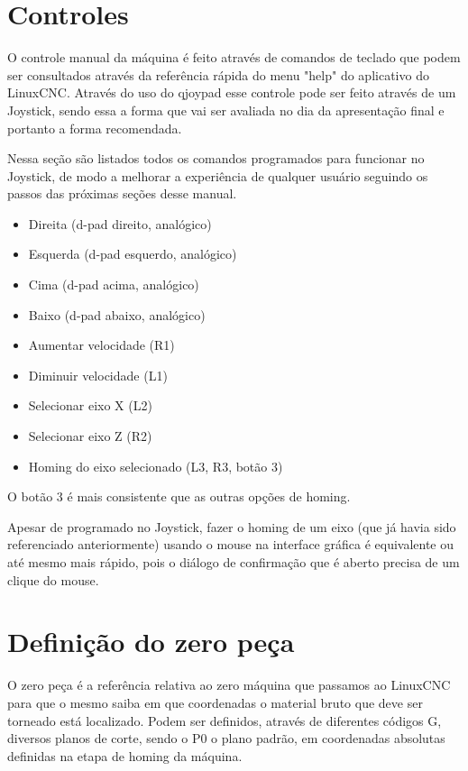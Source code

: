 \documentclass[twoside,a4paper]{refart}
\begin{document}
\section{Controles}

O controle manual da máquina é feito através de comandos de teclado que podem ser consultados através da referência rápida do menu "help" do aplicativo do LinuxCNC. Através do uso do qjoypad esse controle pode ser feito através de um Joystick, sendo essa a forma que vai ser avaliada no dia da apresentação final e portanto a forma recomendada. 

Nessa seção são listados todos os comandos programados para funcionar no Joystick, de modo a melhorar a experiência de qualquer usuário seguindo os passos das próximas seções desse manual. 

\begin{itemize}
    \item Direita (d-pad direito, analógico) 
    \item Esquerda (d-pad esquerdo, analógico)
    \item Cima (d-pad acima, analógico)
    \item Baixo (d-pad abaixo, analógico)
    \item Aumentar velocidade (R1) 
    \item Diminuir velocidade (L1)
    \item Selecionar eixo X (L2)
    \item Selecionar eixo Z (R2)
    \item Homing do eixo selecionado (L3, R3, botão 3)
\end{itemize}

\attention O botão 3 é mais consistente que as outras opções de homing.

\attention Apesar de programado no Joystick, fazer o homing de um eixo (que já havia sido referenciado anteriormente) usando o mouse na interface gráfica é equivalente ou até mesmo mais rápido, pois o diálogo de confirmação que é aberto precisa de um clique do mouse. 

\section{Definição do zero peça}

O zero peça é a referência relativa ao zero máquina que passamos ao LinuxCNC para que o mesmo saiba em que coordenadas o material bruto que deve ser torneado está localizado. Podem ser definidos, através de diferentes códigos G, diversos planos de corte, sendo o P0 o plano padrão, em coordenadas absolutas definidas na etapa de homing da máquina.
 
\end{document}

